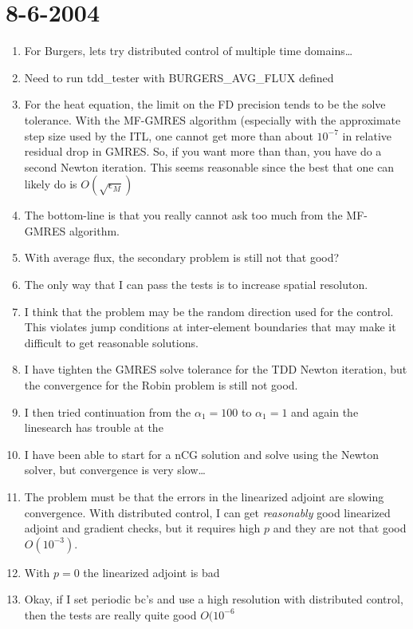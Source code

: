 \documentclass[12pt]{article}
\begin{document}
\section*{8-6-2004}
\begin{enumerate}
\item For Burgers, lets try distributed control of multiple time domains\dots
\item Need to run tdd\_tester with BURGERS\_AVG\_FLUX defined
\item For the heat equation, the limit on the FD precision tends to be the
  solve tolerance.  With the MF-GMRES algorithm (especially with the
  approximate step size used by the ITL, one cannot get more than about
  $10^{-7}$ in relative residual drop in GMRES.  So, if you want more than
  than, you have do a second Newton iteration.  This seems reasonable since
  the best that one can likely do is $O(\sqrt{\epsilon_M})$
\item The bottom-line is that you really cannot ask too much from the MF-GMRES
algorithm.  
\item With average flux, the secondary problem is still not that good?
\item The only way that I can pass the tests is to increase spatial resoluton.
\item I think that the problem may be the random direction used for the
control.  This violates jump conditions at inter-element boundaries that may
make it difficult to get reasonable solutions.
\item I have tighten the GMRES solve tolerance for the TDD Newton iteration,
but the convergence for the Robin problem is still not good.
\item I then tried continuation from the $\alpha_1=100$ to $\alpha_1=1$ and
again the linesearch has trouble at the 
\item I have been able to start for a nCG solution and solve using the Newton
solver, but convergence is very slow\dots
\item The problem must be that the errors in the linearized adjoint are
slowing convergence.  With distributed control, I can get {\em reasonably}
good linearized adjoint and gradient checks, but it requires high $p$ and they
are not that good $O(10^{-3})$.
\item With $p=0$ the linearized adjoint is bad
\item Okay, if I set periodic bc's and use a high resolution with distributed
control, then the tests are really quite good $O(10^{-6}$
\end{enumerate}
\end{document}
